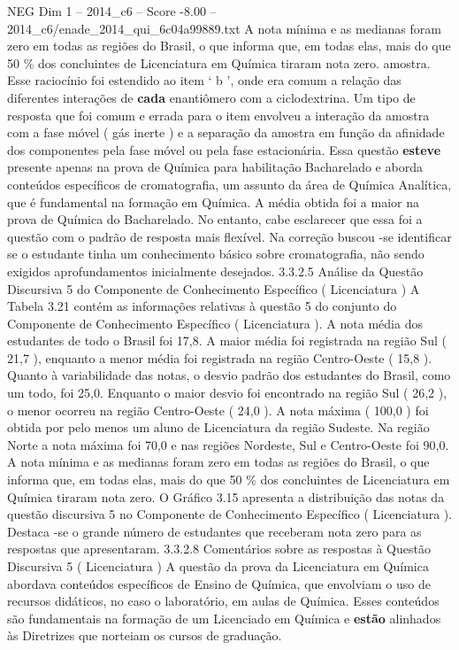 \begin{textsample}{NEG Dim 1 – 2014\_c6 – Score -8.00 – 2014\_c6/enade\_2014\_qui\_6c04a99889.txt}
A nota mínima e as medianas foram zero em todas as regiões do Brasil, o que informa que, em todas elas, mais do que 50 \% dos concluintes de Licenciatura em Química tiraram nota zero. amostra.
Esse raciocínio foi estendido ao item ‘ b ’, onde era comum a relação das diferentes interações de \textbf{cada} enantiômero com a ciclodextrina.
Um tipo de resposta que foi comum e errada para o item envolveu a interação da amostra com a fase móvel ( gás inerte ) e a separação da amostra em função da afinidade dos componentes pela fase móvel ou pela fase estacionária.
Essa questão \textbf{esteve} presente apenas na prova de Química para habilitação Bacharelado e aborda conteúdos específicos de cromatografia, um assunto da área de Química Analítica, que é fundamental na formação em Química.
A média obtida foi a maior na prova de Química do Bacharelado.
No entanto, cabe esclarecer que essa foi a questão com o padrão de resposta mais flexível.
Na correção buscou -se identificar se o estudante tinha um conhecimento básico sobre cromatografia, não sendo exigidos aprofundamentos inicialmente desejados. 3.3.2.5 Análise da Questão Discursiva 5 do Componente de Conhecimento Específico ( Licenciatura ) A Tabela 3.21 contém as informações relativas à questão 5 do conjunto do Componente de Conhecimento Específico ( Licenciatura ).
A nota média dos estudantes de todo o Brasil foi 17,8.
A maior média foi registrada na região Sul ( 21,7 ), enquanto a menor média foi registrada na região Centro-Oeste ( 15,8 ).
Quanto à variabilidade das notas, o desvio padrão dos estudantes do Brasil, como um todo, foi 25,0.
Enquanto o maior desvio foi encontrado na região Sul ( 26,2 ), o menor ocorreu na região Centro-Oeste ( 24,0 ).
A nota máxima ( 100,0 ) foi obtida por pelo menos um aluno de Licenciatura da região Sudeste.
Na região Norte a nota máxima foi 70,0 e nas regiões Nordeste, Sul e Centro-Oeste foi 90,0.
A nota mínima e as medianas foram zero em todas as regiões do Brasil, o que informa que, em todas elas, mais do que 50 \% dos concluintes de Licenciatura em Química tiraram nota zero.
O Gráfico 3.15 apresenta a distribuição das notas da questão discursiva 5 no Componente de Conhecimento Específico ( Licenciatura ).
Destaca -se o grande número de estudantes que receberam nota zero para as respostas que apresentaram. 3.3.2.8 Comentários sobre as respostas à Questão Discursiva 5 ( Licenciatura ) A questão da prova da Licenciatura em Química abordava conteúdos específicos de Ensino de Química, que envolviam o uso de recursos didáticos, no caso o laboratório, em aulas de Química.
Esses conteúdos são fundamentais na formação de um Licenciado em Química e \textbf{estão} alinhados às Diretrizes que norteiam os cursos de graduação.

\end{textsample}
